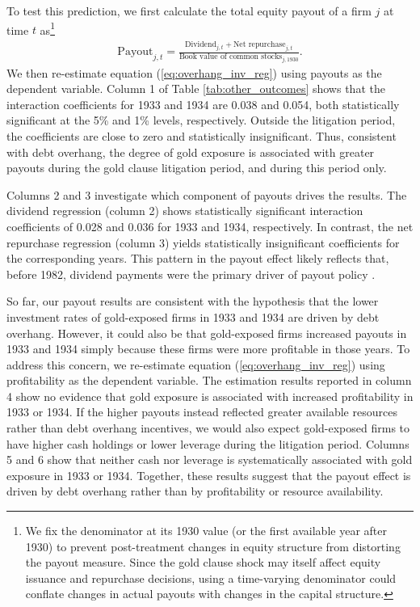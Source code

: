 To test this prediction, we first calculate the total equity payout of a firm $j$ at time $t$ as\footnote{We fix the denominator at its 1930 value (or the first available year after 1930) to prevent post-treatment changes in equity structure from distorting the payout measure. Since the gold clause shock may itself affect equity issuance and repurchase decisions, using a time-varying denominator could conflate changes in actual payouts with changes in the capital structure.}
\begin{align*}
    \text{Payout}_{j,t} = \frac{\text{Dividend}_{j,t} + \text{Net repurchase}_{j,t}}{\text{Book value of common stocks}_{j,1930}}.
\end{align*}
We then re-estimate equation (\ref{eq:overhang_inv_reg}) using payouts as the dependent variable. Column 1 of Table \ref{tab:other_outcomes} shows that the interaction coefficients for 1933 and 1934 are 0.038 and 0.054, both statistically significant at the 5\% and 1\% levels, respectively. Outside the litigation period, the coefficients are close to zero and statistically insignificant. Thus, consistent with debt overhang, the degree of gold exposure is associated with greater payouts during the gold clause litigation period, and during this period only.

Columns 2 and 3 investigate which component of payouts drives the results. The dividend regression (column 2) shows statistically significant interaction coefficients of 0.028 and 0.036 for 1933 and 1934, respectively. In contrast, the net repurchase regression (column 3) yields statistically insignificant coefficients for the corresponding years. This pattern in the payout effect likely reflects that, before 1982, dividend payments were the primary driver of payout policy \citep[e.g.,][]{Michaely2002, Skinner2008}.

So far, our payout results are consistent with the hypothesis that the lower investment rates of gold-exposed firms in 1933 and 1934 are driven by debt overhang. However, it could also be that gold-exposed firms increased payouts in 1933 and 1934 simply because these firms were more profitable in those years. To address this concern, we re-estimate equation (\ref{eq:overhang_inv_reg}) using profitability as the dependent variable. The estimation results reported in column 4 show no evidence that gold exposure is associated with increased profitability in 1933 or 1934. If the higher payouts instead reflected greater available resources rather than debt overhang incentives, we would also expect gold-exposed firms to have higher cash holdings or lower leverage during the litigation period. Columns 5 and 6 show that neither cash nor leverage is systematically associated with gold exposure in 1933 or 1934. Together, these results suggest that the payout effect is driven by debt overhang rather than by profitability or resource availability.

